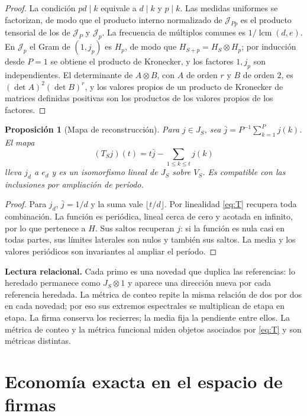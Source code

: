 \documentclass[11pt,a4paper]{article}
\theoremstyle{plain}
\newtheorem{proposicion}{Proposición}
\newcommand{\Jc}{\mathcal{J}}
\newcommand{\lcm}{\operatorname{lcm}}
\begin{document}
\begin{proof}
La condición $pd\mid k$ equivale a $d\mid k$ y $p\mid k$. Las medidas uniformes se factorizan, de modo que el producto interno normalizado de $\Jc_{Pp}$ es el producto tensorial de los de $\Jc_P$ y $\Jc_p$. La frecuencia de múltiplos comunes es $1/\lcm(d,e)$. En $\Jc_p$ el Gram de $(1,j_p)$ es $H_p$, de modo que $H_{S+p}=H_S\otimes H_p$; por inducción desde $P=1$ se obtiene el producto de Kronecker, y los factores $1,j_p$ son independientes. El determinante de $A\otimes B$, con $A$ de orden $r$ y $B$ de orden $2$, es $(\det A)^2(\det B)^r$, y los valores propios de un producto de Kronecker de matrices definidas positivas son los productos de los valores propios de los factores.
\end{proof}

\begin{proposicion}[Mapa de reconstrucción]\label{prop:rec}
Para $j\in J_S$, sea $\bar j=P^{-1}\sum_{k=1}^{P}j(k)$. El mapa
\begin{equation}\label{eq:T}
(T_Sj)(t)=t\bar j-\sum_{1\le k\le t}j(k)
\end{equation}
lleva $j_d$ a $e_d$ y es un isomorfismo lineal de $J_S$ sobre $V_S$. Es compatible con las inclusiones por ampliación de período.
\end{proposicion}

\begin{proof}
Para $j_d$, $\bar j=1/d$ y la suma vale $\lfloor t/d\rfloor$. Por linealidad \eqref{eq:T} recupera toda combinación. La función es periódica, lineal cerca de cero y acotada en infinito, por lo que pertenece a $H$. Sus saltos recuperan $j$: si la función es nula casi en todas partes, sus límites laterales son nulos y también sus saltos. La media y los valores periódicos son invariantes al ampliar el período.
\end{proof}

\textbf{Lectura relacional.} Cada primo es una novedad que duplica las referencias: lo heredado permanece como $J_S\otimes 1$ y aparece una dirección nueva por cada referencia heredada. La métrica de conteo repite la misma relación de dos por dos en cada novedad; por eso sus extremos espectrales se multiplican de etapa en etapa. La firma conserva los recierres; la media fija la pendiente entre ellos. La métrica de conteo y la métrica funcional miden objetos asociados por \eqref{eq:T} y son métricas distintas.

\section{Economía exacta en el espacio de firmas}
\end{document}
